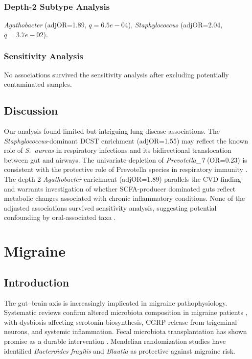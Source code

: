 \documentclass[11pt,a4paper]{article}
\begin{document}
\subsubsection{Depth-2 Subtype Analysis}
\textit{Agathobacter} (adjOR=1.89, $q=6.5e-04$), \textit{Staphylococcus} (adjOR=2.04, $q=3.7e-02$).

\subsubsection{Sensitivity Analysis}
No associations survived the sensitivity analysis after excluding potentially contaminated samples.

\subsection{Discussion}
Our analysis found limited but intriguing lung disease associations. The \textit{Staphylococcus}-dominant DCST enrichment (adjOR=1.55) may reflect the known role of \textit{S.\ aureus} in respiratory infections and its bidirectional translocation between gut and airways. The univariate depletion of \textit{Prevotella\_7} (OR=0.23) is consistent with the protective role of Prevotella species in respiratory immunity \cite{Horn2022_Prevotella_lung}. The depth-2 \textit{Agathobacter} enrichment (adjOR=1.89) parallels the CVD finding and warrants investigation of whether SCFA-producer dominated guts reflect metabolic changes associated with chronic inflammatory conditions. None of the adjusted associations survived sensitivity analysis, suggesting potential confounding by oral-associated taxa \cite{Budden2017_gutlung}.
\newpage

\section{Migraine}
\subsection{Introduction}
The gut--brain axis is increasingly implicated in migraine pathophysiology. Systematic reviews confirm altered microbiota composition in migraine patients \cite{Gorenshtein2025_migraine}, with dysbiosis affecting serotonin biosynthesis, CGRP release from trigeminal neurons, and systemic inflammation. Fecal microbiota transplantation has shown promise as a durable intervention \cite{Kappeter2023_migraine_FMT}. Mendelian randomization studies have identified \textit{Bacteroides fragilis} and \textit{Blautia} as protective against migraine risk.
\end{document}
